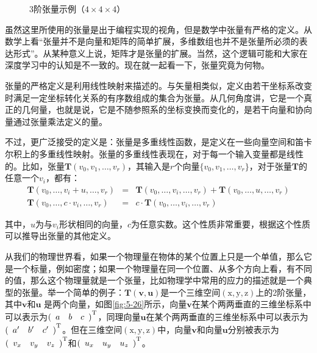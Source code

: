 \begin{figure}[htp]
\centering

\caption{3阶张量示例（$4 \times 4 \times 4$）}
\label{fig:5-25}
\end{figure}

\parinterval 虽然这里所使用的张量是出于编程实现的视角，但是数学中张量有严格的定义。从数学上看``张量并不是向量和矩阵的简单扩展，多维数组也并不是张量所必须的表达形式''。从某种意义上说，矩阵才是张量的扩展。当然，这个逻辑可能和大家在深度学习中的认知是不一致的。现在就一起看一下，张量究竟为何物。

\parinterval 张量的严格定义是利用线性映射来描述的。与矢量相类似，定义由若干坐标系改变时满足一定坐标转化关系的有序数组成的集合为张量。从几何角度讲，它是一个真正的几何量，也就是说，它是不随参照系的坐标变换而变化的，是若干向量和协向量通过张量乘法定义的量。

\parinterval 不过，更广泛接受的定义是：张量是多重线性函数，是定义在一些向量空间和笛卡尔积上的多重线性映射。张量的多重线性表现在，对于每一个输入变量都是线性的。比如，张量$ \mathbf T(v_0,v_1,\dots,v_r) $，其输入是$r$个向量$ \{v_0,v_1,\dots,v_r\} $，对于张量$ \mathbf T $的任意一个$ v_i $，都有：
\begin{eqnarray}
\mathbf T(v_0,\dots,v_i+u,\dots,v_r) & = & \mathbf T(v_0,\dots,v_i,\dots,v_r)+{\mathbf T(v_0,\dots,u,\dots,v_r)}\\
\mathbf T(v_0,\dots,c\cdot v_i,\dots,v_r) & = & c\cdot \mathbf T(v_0,\dots,v_i,\dots,v_r)
\label{eq:5-66}
\end{eqnarray}

\noindent 其中，$ u $为与$ v_i $形状相同的向量，$ c $为任意实数。这个性质非常重要，根据这个性质可以推导出张量的其他定义。

\parinterval 从我们的物理世界看，如果一个物理量在物体的某个位置上只是一个单值，那么它是一个标量，例如密度；如果一个物理量在同一个位置、从多个方向上看，有不同的值，那么这个物理量就是一个张量，比如物理学中常用的应力的描述就是一个典型的张量。举一个简单的例子：$ \mathbf T(\mathbf v,\mathbf u) $是一个三维空间$(\textrm{x},\textrm{y},\textrm{z})$上的2阶张量，其中$ \mathbf v $和$ \mathbf u $ 是两个向量，如图\ref{fig:5-26}所示，向量$ \mathbf v $在某个两两垂直的三维坐标系中可以表示为$ {(\begin{array}{ccc} a & b & c\end{array})}^{\rm T} $，同理向量$ \mathbf u $在某个两两垂直的三维坐标系中可以表示为$ {(\begin{array}{ccc} a' & b' & c' \end{array})}^{\rm T} $。但在三维空间$(\textrm{x},\textrm{y},\textrm{z})$中，向量$ \mathbf v $和向量$ \mathbf u $分别被表示为$ {(\begin{array}{ccc} v_x & v_y & v_z\end{array})}^{\rm T} $和$ {(\begin{array}{ccc} u_x & u_y & u_z\end{array})}^{\rm T} $。

